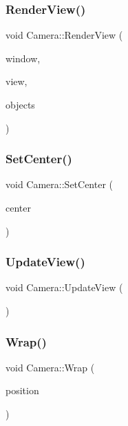 \subsubsection{\texorpdfstring{Render\+View()}{RenderView()}}
{\footnotesize\ttfamily void Camera\+::\+Render\+View (\begin{DoxyParamCaption}\item[{sf\+::\+Render\+Window \&}]{window,  }\item[{sf\+::\+View \&}]{view,  }\item[{std\+::vector$<$ \hyperlink{class_game_object}{Game\+Object} $\ast$$>$ \&}]{objects }\end{DoxyParamCaption})}

\hypertarget{class_camera_a202fc4aff11dc17b8db71b5528c8476a}{}\label{class_camera_a202fc4aff11dc17b8db71b5528c8476a} 
\subsubsection{\texorpdfstring{Set\+Center()}{SetCenter()}}
{\footnotesize\ttfamily void Camera\+::\+Set\+Center (\begin{DoxyParamCaption}\item[{sf\+::\+Vector2f}]{center }\end{DoxyParamCaption})}

\hypertarget{class_camera_a0b31de4a23f304be6e27d53706d326c5}{}\label{class_camera_a0b31de4a23f304be6e27d53706d326c5} 
\subsubsection{\texorpdfstring{Update\+View()}{UpdateView()}}
{\footnotesize\ttfamily void Camera\+::\+Update\+View (\begin{DoxyParamCaption}{ }\end{DoxyParamCaption})}

\hypertarget{class_camera_aca617187658f1cea7f9633b4f62f1e93}{}\label{class_camera_aca617187658f1cea7f9633b4f62f1e93} 
\subsubsection{\texorpdfstring{Wrap()}{Wrap()}\hspace{0.1cm}{\footnotesize\ttfamily [1/2]}}
{\footnotesize\ttfamily void Camera\+::\+Wrap (\begin{DoxyParamCaption}\item[{\hyperlink{class_vector2_d}{Vector2D} \&}]{position }\end{DoxyParamCaption})}

